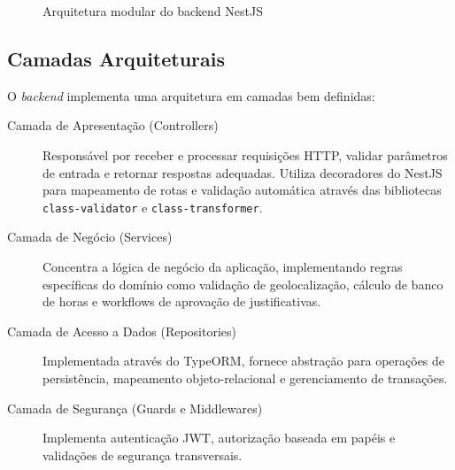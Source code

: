 \begin{figure}[htbp]
\caption{Arquitetura modular do backend NestJS}
\label{fig:arquitetura-backend}
\end{figure}

\subsection{Camadas Arquiteturais}

O \textit{backend} implementa uma arquitetura em camadas bem definidas:

\begin{description}
    \item[Camada de Apresentação (Controllers)] Responsável por receber e processar requisições HTTP, validar parâmetros de entrada e retornar respostas adequadas. Utiliza decoradores do NestJS para mapeamento de rotas e validação automática através das bibliotecas \texttt{class-validator} e \texttt{class-transformer}.
    
    \item[Camada de Negócio (Services)] Concentra a lógica de negócio da aplicação, implementando regras específicas do domínio como validação de geolocalização, cálculo de banco de horas e workflows de aprovação de justificativas.
    
    \item[Camada de Acesso a Dados (Repositories)] Implementada através do TypeORM, fornece abstração para operações de persistência, mapeamento objeto-relacional e gerenciamento de transações.
    
    \item[Camada de Segurança (Guards e Middlewares)] Implementa autenticação JWT, autorização baseada em papéis e validações de segurança transversais.
\end{description}

